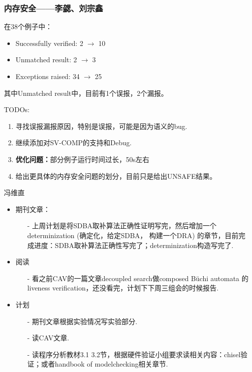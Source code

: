 \documentclass[aspectratio=1610, 13pt]{beamer}
\newcommand{\buchi}{B\"uchi }
\begin{document}
\begin{frame}\frametitle{内存安全——李勰、刘宗鑫}
在38个例子中：
\begin{itemize}
\item Successfully verified: 2 $\rightarrow$ 10
\item Unmatched result: 2 $\rightarrow$ 3
\item Exceptions raised: 34 $\rightarrow$ 25
\end{itemize}

其中Unmatched result中，目前有1个误报，2个漏报。


TODOs:
\begin{enumerate}
\item 寻找误报漏报原因，特别是误报，可能是因为语义的bug.
\item 继续添加对SV-COMP的支持和Debug.
\item \textbf{优化问题：}部分例子运行时间过长，50s左右
\item 给出更具体的内存安全问题的划分，目前只是给出UNSAFE结果。
\end{enumerate}
\end{frame}
\begin{frame}{冯维直}
    \begin{itemize}
        \item 期刊文章：
        \begin{itemize}
            \item [-] 上周计划是将SDBA取补算法正确性证明写完，然后增加一个determinization (确定化，给定SDBA， 构建一个DRA) 的章节，目前完成进度：SDBA取补算法正确性写完了；determinization构造写完了.
        \end{itemize}
        \item 阅读
        \begin{itemize}
            \item [-] 看之前CAV的一篇文章decoupled search做composed \buchi automata 的liveness verification，还没看完，计划下下周三组会的时候报告.
        \end{itemize}
        \item 计划
        \begin{itemize}
            \item [-] 期刊文章根据实验情况写实验部分.
            \item [-] 读CAV文章.
            \item [-] 读程序分析教材3.1 3.2节，根据硬件验证小组要求读相关内容：chisel验证；或者handbook of modelchecking相关章节.
        \end{itemize}
\end{itemize}    
\end{frame}
\end{document}
